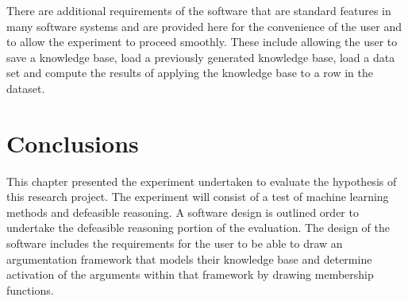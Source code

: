 There are additional requirements of the software that are standard features in many software systems and are provided here for the convenience of the user and to allow the experiment to proceed smoothly. These include allowing the user to save a knowledge base, load a previously generated knowledge base, load a data set and compute the results of applying the knowledge base to a row in the dataset.


\section{Conclusions}

This chapter presented the experiment undertaken to evaluate the hypothesis of this research project. The experiment will consist of a test of machine learning methods and defeasible reasoning. A software design is outlined order to undertake the defeasible reasoning portion of the evaluation. The design of the software includes the requirements for the user to be able to draw an argumentation framework that models their knowledge base and determine activation of the arguments within that framework by drawing membership functions.